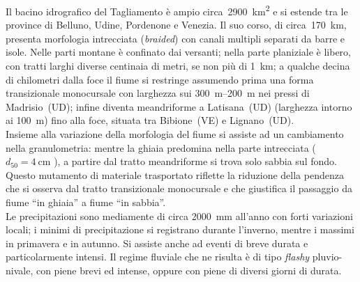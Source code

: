 Il bacino idrografico del Tagliamento è ampio circa~\SI{2900}{\kilo\m\tothe{2}} e si estende tra le province di Belluno, Udine, Pordenone e Venezia.
Il suo corso, di circa~\SI{170}{\kilo\m}, presenta morfologia intrecciata (\emph{braided}) con canali multipli separati da barre e isole.
Nelle parti montane è confinato dai versanti; 
nella parte planiziale è libero, con tratti larghi diverse centinaia di metri, se non più di \SI{1}{\kilo\m};
a qualche decina di chilometri dalla foce il fiume si restringe assumendo prima una forma transizionale monocursale con larghezza sui \SIrange[range-phrase={-}]{300}{200}{\m} nei pressi di Madrisio~(UD);
infine diventa meandriforme a Latisana~(UD) (larghezza intorno ai \SI{100}{\m}) fino alla foce, situata tra Bibione~(VE) e Lignano~(UD).
\\
Insieme alla variazione della morfologia del fiume si assiste ad un cambiamento nella granulometria: mentre la ghiaia predomina nella parte intrecciata ($d_{50} = \SI{4}{\centi\m}$ ), a partire dal tratto meandriforme si trova solo sabbia sul fondo.
Questo mutamento di materiale trasportato riflette la riduzione della pendenza che si osserva dal tratto transizionale monocursale e che giustifica il passaggio da fiume “in ghiaia” a fiume “in sabbia”.
\\
Le precipitazioni sono mediamente di circa \SI{2000}{\mm} all'anno con forti variazioni locali; i minimi di precipitazione si registrano durante l'inverno, mentre i massimi in primavera e in autunno.
Si assiste anche ad eventi di breve durata e particolarmente intensi.
Il regime fluviale che ne risulta è di tipo \emph{flashy} pluvio-nivale, con piene brevi ed intense, oppure con piene di diversi giorni di durata.

